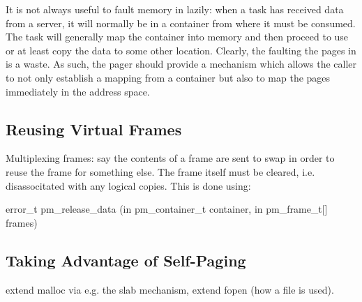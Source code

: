 It is not always useful to fault memory in lazily: when a task has
received data from a server, it will normally be in a container from
where it must be consumed.  The task will generally map the container
into memory and then proceed to use or at least copy the data to some
other location.  Clearly, the faulting the pages in is a waste.  As
such, the pager should provide a mechanism which allows the caller to
not only establish a mapping from a container but also to map the
pages immediately in the address space.

\subsection{Reusing Virtual Frames}

Multiplexing frames: say the contents of a frame are sent to swap in
order to reuse the frame for something else.  The frame itself must be
cleared, i.e. disassocitated with any logical copies.  This is done
using:

\begin{code}
error\_t pm\_release\_data (in pm\_container\_t container, in pm\_frame\_t[] frames)
\end{code}

\subsection{Taking Advantage of Self-Paging}

extend malloc via e.g. the slab mechanism, extend fopen (how a file is
used).

% 
% 
% 
% 

